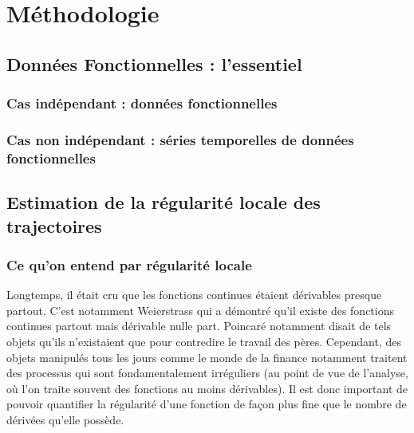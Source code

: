 \chapter{Méthodologie}
\minitoc%



\section{Données Fonctionnelles : l'essentiel}
    \subsection{Cas indépendant : données fonctionnelles}

    \subsection{Cas non indépendant : séries temporelles de données fonctionnelles}
        
    

\section{Estimation de la régularité locale des trajectoires}

\subsection{Ce qu'on entend par régularité locale}

Longtemps, il était cru que les fonctions continues étaient dérivables presque partout. C'est notamment Weierstrass qui a démontré qu'il existe des fonctions continues partout mais dérivable nulle part. Poincaré notamment disait de tels objets qu'ils n'existaient que pour contredire le travail des pères. 
Cependant, des objets manipulés tous les jours comme le monde de la finance notamment traitent des processus qui sont fondamentalement irréguliers (au point de vue de l'analyse, où l'on traite souvent des fonctions au moins dérivables). Il est donc important de pouvoir quantifier la régularité d'une fonction de façon plus fine que le nombre de dérivées qu'elle possède. 

